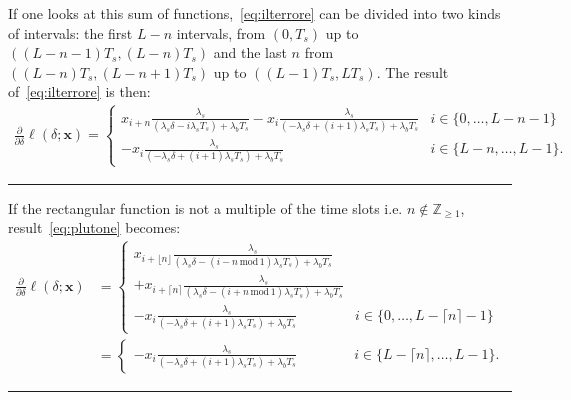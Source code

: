 \noindent
If one looks at this sum of functions,~\eqref{eq:ilterrore} can be divided into two kinds of intervals: the first \(L-n\) intervals, from \((0,T_s)\) up to \( \left((L-n-1)T_s,(L-n)T_s\right)\) and the last \(n\) from \(((L-n)T_s,(L-n+1)T_s)\) up to \( \left((L-1)T_s,LT_s\right)\). The result of~\eqref{eq:ilterrore} is then:
\begin{equation}
\begin{aligned}
\frac{\partial}{\partial \delta} \ell(\delta ; \mathbf{x}) =
\begin{cases}
x_{i+n} \frac{\lambda_s}{\left(\lambda_s \delta-i \lambda_s T_s\right)+\lambda_b T_s}
-x_i \frac{\lambda_s}{\left(-\lambda_s \delta+(i+1) \lambda_s T_s\right)+\lambda_b T_s} 
& i\in\{0, \ldots, L-n-1\} \\ 
-x_i \frac{\lambda_s}{\left(-\lambda_s \delta+(i+1) \lambda_s T_s\right)+\lambda_b T_s} 
& i\in\{L-n, \ldots, L-1\}.
\end{cases}
\end{aligned}
\label{eq:plutone}
\end{equation} 

\medskip
\noindent\rule{\linewidth}{0.4pt} %
\medskip
If the rectangular function is not a multiple of the time slots i.e. \(n \notin \mathbb{Z}_{\geq1}\), result~\eqref{eq:plutone} becomes:
\begin{equation}
\begin{aligned}
\frac{\partial}{\partial \delta} \ell(\delta ; \mathbf{x}) 
&=
\begin{cases}
x_{i+\lfloor n\rfloor} \frac{\lambda_s}{\left(\lambda_s \delta-(i-n\,\text{mod}\,1) \lambda_s T_s\right)+\lambda_b T_s}\\
+x_{i+\lceil n\rceil} \frac{\lambda_s}{\left(\lambda_s \delta-(i+n\,\text{mod}\,1) \lambda_s T_s\right)+\lambda_b T_s}\\
-x_i \frac{\lambda_ s}{\left(-\lambda_s \delta+(i+1) \lambda_s T_s\right)+\lambda_b T_s} 
& i\in\{0, \ldots, L-\lceil n\rceil-1\}\
\end{cases}\\
&=
\begin{cases}
-x_i \frac{\lambda_s}{\left(-\lambda_s \delta+(i+1) \lambda_s T_s\right)+\lambda_b T_s} 
& \qquad \quad \; i\in\{L-\lceil n \rceil, \ldots, L-1\}.
\end{cases}
\end{aligned}
\end{equation} 
\medskip
\noindent\rule{\linewidth}{0.4pt} %
\medskip

